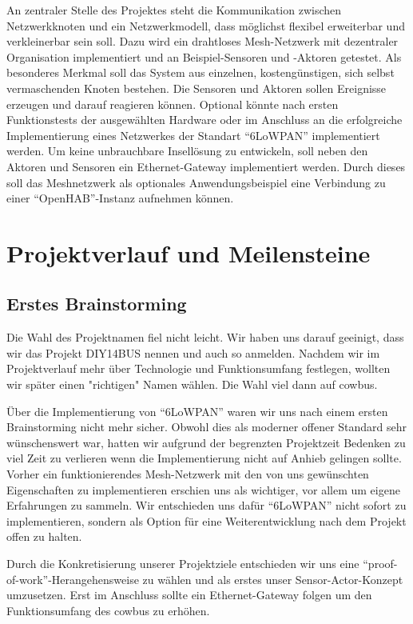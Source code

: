 \documentclass{IEEEtran}
\begin{document}
    An zentraler Stelle des Projektes steht die Kommunikation zwischen Netzwerkknoten 
    und ein Netzwerkmodell, dass möglichst flexibel erweiterbar und verkleinerbar 
    sein soll. 
    Dazu wird ein drahtloses Mesh-Netzwerk mit dezentraler Organisation implementiert 
    und an Beispiel-Sensoren und -Aktoren getestet. 
    Als besonderes Merkmal soll das System aus einzelnen, kostengünstigen, sich 
    selbst vermaschenden Knoten bestehen.
    Die Sensoren und Aktoren sollen Ereignisse erzeugen und darauf reagieren können. 
    Optional könnte nach ersten Funktionstests der ausgewählten Hardware oder im 
    Anschluss an die erfolgreiche Implementierung eines Netzwerkes der Standart 
    \enquote{6LoWPAN} implementiert werden. 
    Um keine unbrauchbare Insellösung zu entwickeln, soll neben den Aktoren und 
    Sensoren ein Ethernet-Gateway implementiert werden. Durch dieses soll das 
    Meshnetzwerk als optionales Anwendungsbeispiel eine Verbindung zu 
    einer \enquote{OpenHAB}-Instanz aufnehmen können.


\section{Projektverlauf und Meilensteine}
    \subsection{Erstes Brainstorming}
    Die Wahl des Projektnamen fiel nicht leicht. Wir haben uns darauf geeinigt, dass 
    wir das Projekt DIY14BUS nennen und auch so anmelden. Nachdem wir im 
    Projektverlauf mehr über Technologie und Funktionsumfang festlegen, wollten wir 
    später einen "richtigen" Namen wählen. Die Wahl viel dann auf cowbus.

    Über die Implementierung von \enquote{6LoWPAN} waren wir uns nach einem ersten 
    Brainstorming nicht mehr sicher. Obwohl dies als moderner offener Standard 
    sehr wünschenswert war, hatten wir aufgrund der begrenzten Projektzeit Bedenken 
    zu viel Zeit zu verlieren wenn die Implementierung nicht auf Anhieb gelingen 
    sollte. Vorher ein funktionierendes Mesh-Netzwerk mit den von uns gewünschten 
    Eigenschaften zu implementieren erschien uns als wichtiger, vor allem um 
    eigene Erfahrungen zu sammeln. Wir entschieden uns dafür \enquote{6LoWPAN} 
    nicht sofort zu implementieren, sondern als Option für eine Weiterentwicklung 
    nach dem Projekt offen zu halten.

    Durch die Konkretisierung unserer Projektziele entschieden wir uns eine 
    \enquote{proof-of-work}-Herangehensweise zu wählen und als erstes unser 
    Sensor-Actor-Konzept umzusetzen. Erst im Anschluss sollte ein 
    Ethernet-Gateway folgen um den Funktionsumfang des cowbus zu erhöhen.
\end{document}
